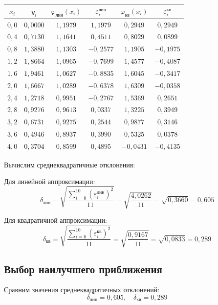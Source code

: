 \begin{table}[h!]
\centering
\label{tab:compare}
\renewcommand{\arraystretch}{1.5}
\begin{tabular}{|c|c|c|c|c|c|}
\hline
$x_i$ & $y_i$ & $\varphi_{\text{лин}}(x_i)$ & $\varepsilon_i^{\text{лин}}$ & $\varphi_{\text{кв}}(x_i)$ & $\varepsilon_i^{\text{кв}}$ \\
\hline
$0{,}0$ & $0{,}0000$ & $1{,}1979$ & $1{,}1979$ & $0{,}2949$ & $0{,}2949$ \\
$0{,}4$ & $0{,}7130$ & $1{,}1641$ & $0{,}4511$ & $0{,}8029$ & $0{,}0899$ \\
$0{,}8$ & $1{,}3880$ & $1{,}1303$ & $-0{,}2577$ & $1{,}1905$ & $-0{,}1975$ \\
$1{,}2$ & $1{,}8664$ & $1{,}0965$ & $-0{,}7699$ & $1{,}4577$ & $-0{,}4087$ \\
$1{,}6$ & $1{,}9461$ & $1{,}0627$ & $-0{,}8835$ & $1{,}6045$ & $-0{,}3417$ \\
$2{,}0$ & $1{,}6667$ & $1{,}0289$ & $-0{,}6378$ & $1{,}6309$ & $-0{,}0358$ \\
$2{,}4$ & $1{,}2718$ & $0{,}9951$ & $-0{,}2767$ & $1{,}5369$ & $0{,}2651$ \\
$2{,}8$ & $0{,}9276$ & $0{,}9613$ & $0{,}0337$ & $1{,}3225$ & $0{,}3949$ \\
$3{,}2$ & $0{,}6731$ & $0{,}9275$ & $0{,}2544$ & $0{,}9877$ & $0{,}3146$ \\
$3{,}6$ & $0{,}4946$ & $0{,}8937$ & $0{,}3990$ & $0{,}5325$ & $0{,}0378$ \\
$4{,}0$ & $0{,}3704$ & $0{,}8599$ & $0{,}4895$ & $-0{,}0431$ & $-0{,}4135$ \\
\hline
\end{tabular}
\end{table}

\newpage
Вычислим среднеквадратичные отклонения:

Для линейной аппроксимации:
\[
\delta_{\text{лин}} = \sqrt{\frac{\sum_{i=0}^{10} (\varepsilon_i^{\text{лин}})^2}{11}} = \sqrt{\frac{4{,}0262}{11}} = \sqrt{0{,}3660} = 0{,}605
\]

Для квадратичной аппроксимации:
\[
\delta_{\text{кв}} = \sqrt{\frac{\sum_{i=0}^{10} (\varepsilon_i^{\text{кв}})^2}{11}} = \sqrt{\frac{0{,}9167}{11}} = \sqrt{0{,}0833} = 0{,}289
\]

\subsection{Выбор наилучшего приближения}

Сравним значения среднеквадратичных отклонений:
\[
\delta_{\text{лин}} = 0{,}605,\quad \delta_{\text{кв}} = 0{,}289
\]

